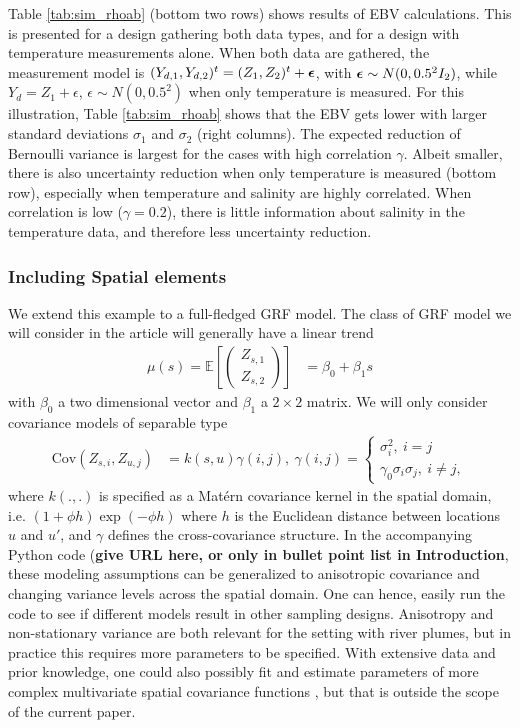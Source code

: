 \documentclass[aoas]{imsart}
\begin{document}
Table \ref{tab:sim_rhoab} (bottom two rows) shows results of EBV calculations. This is presented for a design
gathering both data types, and for a design with temperature
measurements alone. When both data are gathered, the measurement model is
$(Y_{d,1},Y_{d,2})^t=(Z_1,Z_2)^t+{\boldsymbol \epsilon}$, with ${\boldsymbol \epsilon} \sim N(0,0.5^2I_2)$, while $Y_d=Z_1+\epsilon$, $\epsilon \sim N(0,0.5^2)$ when only temperature is measured.
For this illustration, Table \ref{tab:sim_rhoab} shows that the
EBV gets lower with larger standard deviations
$\sigma_1$ and $\sigma_2$ (right columns). The expected reduction of Bernoulli
variance is largest for the cases with high correlation
$\gamma$. Albeit smaller, there is also uncertainty reduction when
only temperature is measured (bottom row), especially when temperature
and salinity are highly correlated. When correlation is low
($\gamma=0.2$), there is little information about salinity in the
temperature data, and therefore less uncertainty reduction. 

\subsubsection{Including Spatial elements}
We extend this example to a full-fledged GRF model. 
The class of GRF model we will consider in the article will generally have a linear trend
\begin{align*}
\mu(s)=\mathbb{E}\left[\begin{pmatrix}
Z_{s, 1}\\ Z_{s, 2}
\end{pmatrix}\right] &= \beta_0 + \beta_1 s
\end{align*}
with $\beta_0$ a two dimensional vector and $\beta_1$ a $2\times 2$ matrix. We will only consider covariance models of separable type
\begin{align*}
\textrm{Cov}\left(Z_{s, i}, Z_{u, j}\right) &= k(s, u) \gamma(i, j),~ \gamma(i, j) = \begin{cases} \sigma_i^2,~ i=j\\
   \gamma_0 \sigma_i \sigma_j,~i\neq j,
        \end{cases}
\end{align*}
where $k(., .)$ is specified as a Mat\'{e}rn covariance kernel in the spatial domain, i.e. $(1+\phi h) \exp(-\phi h)$ where $h$ is the Euclidean distance between locations $u$ and $u'$, and $\gamma$ defines the cross-covariance structure. In the accompanying Python code ({\bf{give URL here, or only in bullet point list in Introduction}}, these modeling assumptions can be
generalized to anisotropic covariance and changing variance levels
across the spatial domain. One can hence, easily run the code to see
if different models result in other sampling designs. Anisotropy and
non-stationary variance are both relevant for the setting with river
plumes, but in practice this requires more parameters to be
specified. With extensive data and prior knowledge, one could also
possibly fit and estimate parameters of more complex multivariate
spatial covariance functions
\citep{gneiting2010matern,genton2015cross}, but that is outside the
scope of the current paper.
\end{document}

